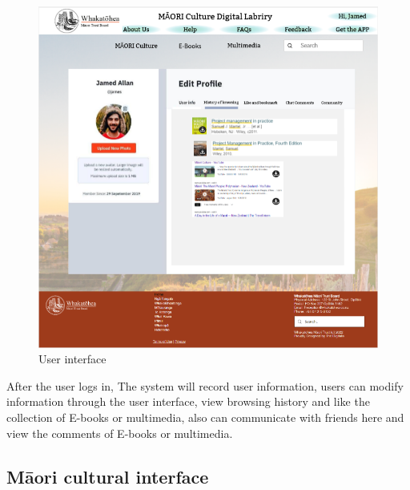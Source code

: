 \begin{figure}[htbp]
  \centerline{\includegraphics[width=400pt]{images/3-1-2.png}}
  \caption{User interface}
  \label{fig30}
\end{figure}

After the user logs in, The system will record user information, users can modify information through the user interface, view browsing history and like the collection of E-books or multimedia, also can communicate with friends here and view the comments of E-books or multimedia.

\subsection{Māori cultural interface}

